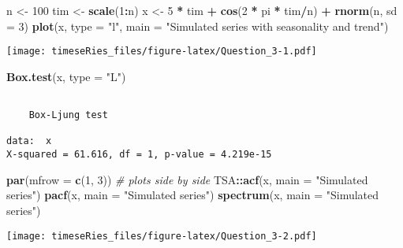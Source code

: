 \documentclass[]{book}
\newenvironment{Shaded}{\begin{snugshade}}{\end{snugshade}}
\newcommand{\CommentTok}[1]{\textcolor[rgb]{0.56,0.35,0.01}{\textit{#1}}}
\newcommand{\DataTypeTok}[1]{\textcolor[rgb]{0.13,0.29,0.53}{#1}}
\newcommand{\DecValTok}[1]{\textcolor[rgb]{0.00,0.00,0.81}{#1}}
\newcommand{\KeywordTok}[1]{\textcolor[rgb]{0.13,0.29,0.53}{\textbf{#1}}}
\newcommand{\NormalTok}[1]{#1}
\newcommand{\OperatorTok}[1]{\textcolor[rgb]{0.81,0.36,0.00}{\textbf{#1}}}
\newcommand{\StringTok}[1]{\textcolor[rgb]{0.31,0.60,0.02}{#1}}
\begin{document}
\begin{Shaded}
\begin{Highlighting}[]
\NormalTok{n <-}\StringTok{ }\DecValTok{100}
\NormalTok{tim <-}\StringTok{ }\KeywordTok{scale}\NormalTok{(}\DecValTok{1}\OperatorTok{:}\NormalTok{n)}
\NormalTok{x <-}\StringTok{ }\DecValTok{5} \OperatorTok{*}\StringTok{ }\NormalTok{tim }\OperatorTok{+}\StringTok{ }\KeywordTok{cos}\NormalTok{(}\DecValTok{2} \OperatorTok{*}\StringTok{ }\NormalTok{pi }\OperatorTok{*}\StringTok{ }\NormalTok{tim}\OperatorTok{/}\NormalTok{n) }\OperatorTok{+}\StringTok{ }\KeywordTok{rnorm}\NormalTok{(n, }\DataTypeTok{sd =} \DecValTok{3}\NormalTok{)}
\KeywordTok{plot}\NormalTok{(x, }\DataTypeTok{type =} \StringTok{"l"}\NormalTok{, }\DataTypeTok{main =} \StringTok{"Simulated series with seasonality and trend"}\NormalTok{)}
\end{Highlighting}
\end{Shaded}

\texttt{[image: timeseRies\_files/figure-latex/Question\_3-1.pdf]}

\begin{Shaded}
\begin{Highlighting}[]
\KeywordTok{Box.test}\NormalTok{(x, }\DataTypeTok{type =} \StringTok{"L"}\NormalTok{)}
\end{Highlighting}
\end{Shaded}

\begin{verbatim}

    Box-Ljung test

data:  x
X-squared = 61.616, df = 1, p-value = 4.219e-15
\end{verbatim}

\begin{Shaded}
\begin{Highlighting}[]
\KeywordTok{par}\NormalTok{(}\DataTypeTok{mfrow =} \KeywordTok{c}\NormalTok{(}\DecValTok{1}\NormalTok{, }\DecValTok{3}\NormalTok{))  }\CommentTok{# plots side by side}
\NormalTok{TSA}\OperatorTok{::}\KeywordTok{acf}\NormalTok{(x, }\DataTypeTok{main =} \StringTok{"Simulated series"}\NormalTok{)}
\KeywordTok{pacf}\NormalTok{(x, }\DataTypeTok{main =} \StringTok{"Simulated series"}\NormalTok{)}
\KeywordTok{spectrum}\NormalTok{(x, }\DataTypeTok{main =} \StringTok{"Simulated series"}\NormalTok{)}
\end{Highlighting}
\end{Shaded}

\texttt{[image: timeseRies\_files/figure-latex/Question\_3-2.pdf]}
\end{document}
